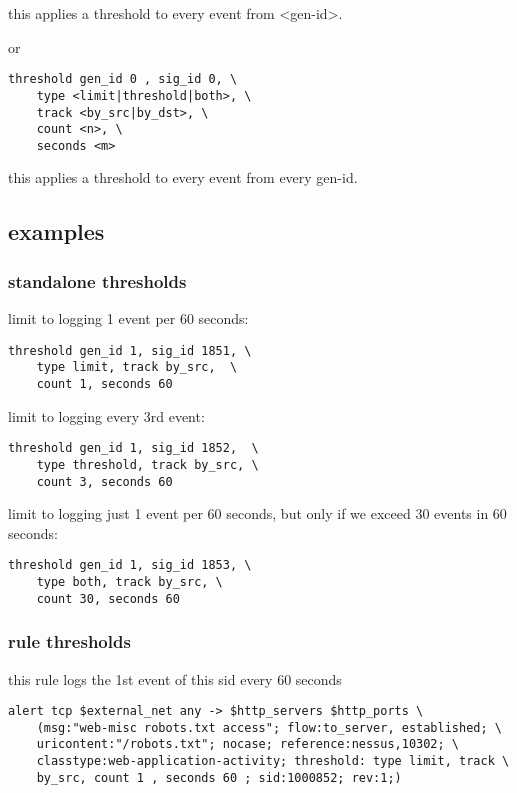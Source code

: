 \documentclass[english]{report}
\begin{document}
this applies a threshold to every event from <gen-id>.

or 

\begin{verbatim}
threshold gen_id 0 , sig_id 0, \
    type <limit|threshold|both>, \
    track <by_src|by_dst>, \
    count <n>, \
    seconds <m>
\end{verbatim}

this applies a threshold to every event from every gen-id.

\subsection{examples}
\subsubsection{standalone thresholds}

limit to logging 1 event per 60 seconds:
\begin{verbatim}
threshold gen_id 1, sig_id 1851, \
    type limit, track by_src,  \
    count 1, seconds 60
\end{verbatim}

limit to logging every 3rd event:
\begin{verbatim}
threshold gen_id 1, sig_id 1852,  \
    type threshold, track by_src, \
    count 3, seconds 60
\end{verbatim}

limit to logging just 1 event per 60 seconds, but only if we exceed 30 events in 60 seconds:
\begin{verbatim}
threshold gen_id 1, sig_id 1853, \
    type both, track by_src, \
    count 30, seconds 60
\end{verbatim}

\subsubsection{rule thresholds}

this rule logs the 1st event of this sid every 60 seconds

\begin{verbatim}
alert tcp $external_net any -> $http_servers $http_ports \
    (msg:"web-misc robots.txt access"; flow:to_server, established; \
    uricontent:"/robots.txt"; nocase; reference:nessus,10302; \
    classtype:web-application-activity; threshold: type limit, track \
    by_src, count 1 , seconds 60 ; sid:1000852; rev:1;)
\end{verbatim}
                 
\end{document}
